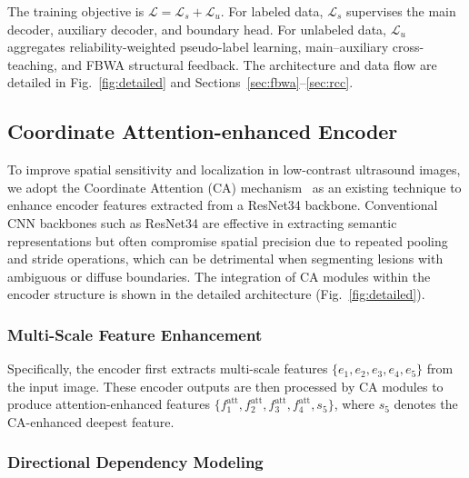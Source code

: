 \documentclass[a4paper,fleqn]{cas-dc}
\begin{document}
The training objective is $\mathcal{L}=\mathcal{L}_s+\mathcal{L}_u$. For labeled data, $\mathcal{L}_s$ supervises the main decoder, auxiliary decoder, and boundary head. For unlabeled data, $\mathcal{L}_u$ aggregates reliability-weighted pseudo-label learning, main--auxiliary cross-teaching, and FBWA structural feedback. The architecture and data flow are detailed in Fig.~\ref{fig:detailed} and Sections~\ref{sec:fbwa}--\ref{sec:rcc}.

\subsection{Coordinate Attention-enhanced Encoder}
To improve spatial sensitivity and localization in low-contrast ultrasound images, we adopt the Coordinate Attention (CA) mechanism~\cite{b7} as an existing technique to enhance encoder features extracted from a ResNet34 backbone. Conventional CNN backbones such as ResNet34 are effective in extracting semantic representations but often compromise spatial precision due to repeated pooling and stride operations, which can be detrimental when segmenting lesions with ambiguous or diffuse boundaries. The integration of CA modules within the encoder structure is shown in the detailed architecture (Fig.~\ref{fig:detailed}).

\subsubsection{Multi-Scale Feature Enhancement}
Specifically, the encoder first extracts multi-scale features $\{e_1, e_2, e_3, e_4, e_5\}$ from the input image. These encoder outputs are then processed by CA modules to produce attention-enhanced features $\{f_1^{\text{att}}, f_2^{\text{att}}, f_3^{\text{att}}, f_4^{\text{att}}, s_5\}$, where $s_5$ denotes the CA-enhanced deepest feature.

\subsubsection{Directional Dependency Modeling}
\end{document}
